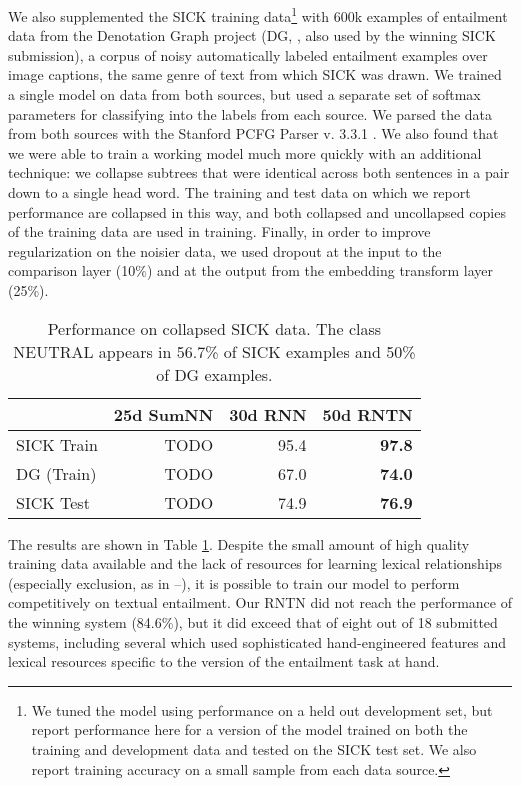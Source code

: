 We also supplemented the SICK training data\footnote{We tuned the model using performance on a held out development set, but report performance here for a version of the model trained on both the training and development data and tested on the SICK test set. We also report training accuracy on a small sample from each data source.} with 600k examples of entailment data from the Denotation Graph project (DG, \citealt{hodoshimage}, also used by the winning SICK submission), a corpus of noisy automatically labeled entailment examples over image captions, the same genre of text from which SICK was drawn. We trained a single model on data from both sources, but used a separate set of softmax parameters for classifying into the labels from each source. We parsed the data from both sources with the Stanford PCFG Parser v. 3.3.1 \cite{klein2003accurate}. We also found that we were able to train a working model much more quickly with an additional technique: we collapse subtrees that were identical across both sentences in a pair down to a single head word. The training and test data on which we report performance are collapsed in this way, and both collapsed and uncollapsed copies of the training data are used in training. Finally, in order to improve regularization on the noisier data, we used dropout \cite{srivastava2014dropout} at the input to the comparison layer (10\%) and at the output from the embedding transform layer (25\%). 

\begin{table}[tp]
  \centering \small
  \begin{tabular}{ l r@{ \ } r@{ \ } r@{ \ } }
    \toprule
    ~&\multicolumn{1}{c}{25d SumNN} & \multicolumn{1}{c}{30d RNN}  & \multicolumn{1}{c}{50d RNTN}\\
    \midrule
    SICK Train &  TODO & 95.4 &  \textbf{97.8}  \\
    DG (Train) &  TODO & 67.0 & \textbf{74.0}  \\
    SICK Test & TODO & 74.9 & \textbf{76.9}  \\
    \bottomrule
  \end{tabular}
  \caption{Performance on collapsed SICK data. The class NEUTRAL appears in 56.7\% of SICK examples and 50\% of DG examples.}
  \label{sresultstable}
\end{table} 

The results are shown in Table \ref{sresultstable}. Despite the small amount of high quality training data available and the lack of resources for learning lexical relationships (especially exclusion, as in --), it is possible to train our model to perform competitively on textual entailment. Our RNTN did not reach the performance of the winning system (84.6\%), but it did exceed that of eight out of 18 submitted systems, including several which used sophisticated hand-engineered features and lexical resources specific to the version of the entailment task at hand. 

